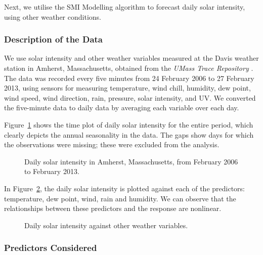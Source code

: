 \documentclass[
  11pt,
  a4paper,
]{article}
\begin{document}
Next, we utilise the SMI Modelling algorithm to forecast daily solar
intensity, using other weather conditions.

\subsubsection{Description of the Data}\label{description-of-the-data-1}

We use solar intensity and other weather variables measured at the Davis
weather station in Amherst, Massachusetts, obtained from the \emph{UMass
Trace Repository} \autocite{Umass2023}. The data was recorded every five
minutes from 24 February 2006 to 27 February 2013, using sensors for
measuring temperature, wind chill, humidity, dew point, wind speed, wind
direction, rain, pressure, solar intensity, and UV. We converted the
five-minute data to daily data by averaging each variable over each day.

Figure~\ref{fig-solar} shows the time plot of daily solar intensity for
the entire period, which clearly depicts the annual seasonality in the
data. The gaps show days for which the observations were missing; these
were excluded from the analysis.

\begin{figure}


\caption{\label{fig-solar}Daily solar intensity in Amherst,
Massachusetts, from February 2006 to February 2013.}

\end{figure}%

In Figure~\ref{fig-preds}, the daily solar intensity is plotted against
each of the predictors: temperature, dew point, wind, rain and humidity.
We can observe that the relationships between these predictors and the
response are nonlinear.

\begin{figure}


\caption{\label{fig-preds}Daily solar intensity against other weather
variables.}

\end{figure}%

\subsubsection{Predictors Considered}\label{predictors-considered-1}
\end{document}
